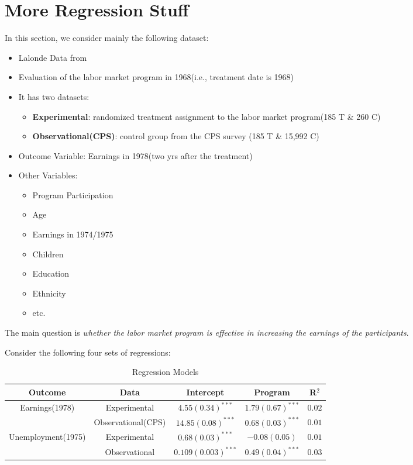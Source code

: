 \section{More Regression Stuff}

In this section, we consider mainly the following dataset:

\begin{itemize}
    \item Lalonde Data from \textcite{dehejia1999causal}
    \item Evaluation of the labor market program in 1968(i.e., treatment date is 1968)
    \item It has two datasets:
    \begin{itemize}
        \item \textbf{Experimental}: randomized treatment assignment to the labor market program(185 T \& 260 C)
        \item \textbf{Observational(CPS)}: control group from the CPS survey (185 T \& 15,992 C)
    \end{itemize}
    \item Outcome Variable: Earnings in 1978(two yrs after the treatment)
    \item Other Variables:
    \begin{itemize}
        \item Program Participation
        \item Age
        \item Earnings in 1974/1975
        \item Children
        \item Education
        \item Ethnicity
        \item etc.
    \end{itemize}
\end{itemize}

The main question is \textit{whether the labor market program is effective in increasing the earnings of the participants}.

Consider the following four sets of regressions:

\begin{table}[h]
    \centering
    \caption{Regression Models}
    \label{tab:regression_models}
    \begin{tabular}{c|c|c|c|c}
        \hline
        Outcome & Data & Intercept & Program & R$^2$ \\
        \hline
        \multirow{2}{*}{Earnings(1978)} & Experimental & $4.55(0.34)^{***}$ & $1.79(0.67)^{***}$ & $0.02$ \\
        \cline{2-5}
        & Observational(CPS) & $14.85(0.08)^{***}$ & $0.68(0.03)^{***}$ & $0.01$ \\
        \hline
        \multirow{2}{*}{Unemployment(1975)} & Experimental & $0.68(0.03)^{***}$ & $-0.08(0.05)$ & $0.01$ \\
        \cline{2-5}
        & Observational & $0.109(0.003)^{***}$ & $0.49(0.04)^{***}$ & $0.03$ \\
        \hline
    \end{tabular}
\end{table}

